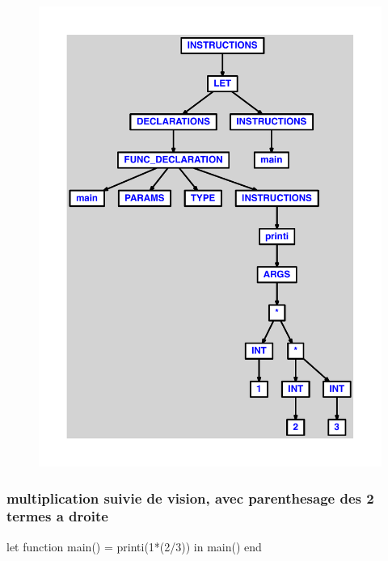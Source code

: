 \documentclass{article}
\begin{document}
\begin{figure}[H]\centering\includegraphics[max width=\textwidth]{ast/ast_93.pdf}\end{figure}\subsubsection{multiplication suivie de vision, avec parenthesage des 2 termes a droite}
\begin{verbatimtab}
let function main() = printi(1*(2/3)) in main() end
\end{verbatimtab}
\end{document}
